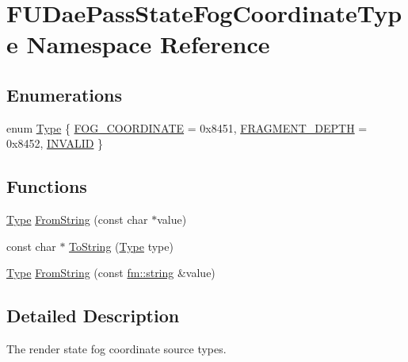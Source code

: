 \hypertarget{namespaceFUDaePassStateFogCoordinateType}{
\section{FUDaePassStateFogCoordinateType Namespace Reference}
\label{namespaceFUDaePassStateFogCoordinateType}
}
\subsection*{Enumerations}
\begin{DoxyCompactItemize}
\item 
enum \hyperlink{namespaceFUDaePassStateFogCoordinateType_a5aee827a1b7527529d70a8c5cf03a7a7}{Type} \{ \hyperlink{namespaceFUDaePassStateFogCoordinateType_a5aee827a1b7527529d70a8c5cf03a7a7ade752efdc9b3807bac2a9d53c867093a}{FOG\_\-COORDINATE} =  0x8451, 
\hyperlink{namespaceFUDaePassStateFogCoordinateType_a5aee827a1b7527529d70a8c5cf03a7a7a55c728dca457f12de99edc5e95a55bab}{FRAGMENT\_\-DEPTH} =  0x8452, 
\hyperlink{namespaceFUDaePassStateFogCoordinateType_a5aee827a1b7527529d70a8c5cf03a7a7ad82ae50d75a09152a709f246cbae3d33}{INVALID}
 \}
\end{DoxyCompactItemize}
\subsection*{Functions}
\begin{DoxyCompactItemize}
\item 
\hyperlink{namespaceFUDaePassStateFogCoordinateType_a5aee827a1b7527529d70a8c5cf03a7a7}{Type} \hyperlink{namespaceFUDaePassStateFogCoordinateType_ac662240abeaf200d1303ad43f2e67f51}{FromString} (const char $\ast$value)
\item 
const char $\ast$ \hyperlink{namespaceFUDaePassStateFogCoordinateType_aa9bf626bbb748bec31c5d4c39a0965ba}{ToString} (\hyperlink{namespaceFUDaePassStateFogCoordinateType_a5aee827a1b7527529d70a8c5cf03a7a7}{Type} type)
\item 
\hyperlink{namespaceFUDaePassStateFogCoordinateType_a5aee827a1b7527529d70a8c5cf03a7a7}{Type} \hyperlink{namespaceFUDaePassStateFogCoordinateType_a5fe561d03117a83f06bc41fc6dd5a3ef}{FromString} (const \hyperlink{classfm_1_1stringT}{fm::string} \&value)
\end{DoxyCompactItemize}


\subsection{Detailed Description}
The render state fog coordinate source types. 

